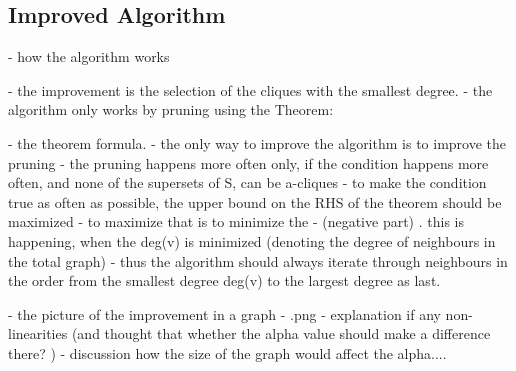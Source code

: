 \subsection{Improved Algorithm}

- how the algorithm works

- the improvement is the selection of the cliques with the smallest degree.
- the algorithm only works by pruning using the Theorem:

- the theorem formula.
- the only way to improve the algorithm is to improve the pruning
- the pruning happens more often only, if the condition happens more often, and none of the supersets of S, can be a-cliques
- to make the condition true as often as possible, the upper bound on the RHS of the theorem should be maximized
- to maximize that is to minimize the - (negative part) . this is happening, when the deg(v) is minimized (denoting the degree of neighbours in the total graph)
- thus the algorithm should always iterate through neighbours in the order from the smallest degree deg(v) to the largest degree as last.





- the picture of the improvement in a graph
- .png
- explanation if any non-linearities (and thought that whether the alpha value should make a difference there? )
- discussion how the size of the graph would affect the alpha....
